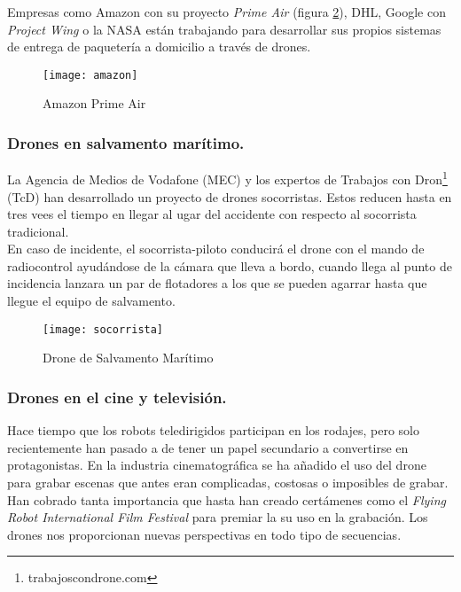 Empresas como Amazon con su proyecto \emph{Prime Air} (figura \ref{fig:amazon}), DHL, Google con \emph{Project Wing} o la NASA están trabajando para desarrollar sus propios sistemas de entrega de paquetería a domicilio a través de drones.\\

\begin{figure}[htb]
\centering
\texttt{[image: amazon]}
\caption{Amazon Prime Air}
\label{fig:amazon}
\end{figure}

\subsubsection{Drones en salvamento marítimo.}

La Agencia de Medios de Vodafone (MEC) y los expertos de Trabajos con Dron\footnote{trabajoscondrone.com} (TcD) han desarrollado un proyecto de drones socorristas. Estos reducen hasta en tres vees el tiempo en llegar al ugar del accidente con respecto al socorrista tradicional.\\

En caso de incidente, el socorrista-piloto conducirá el drone con el mando de radiocontrol ayudándose de la cámara que lleva a bordo, cuando llega al punto de incidencia lanzara un par de flotadores a los que se pueden agarrar hasta que llegue el equipo de salvamento.\\

 \begin{figure}[htb]
\centering
\texttt{[image: socorrista]}
\caption{Drone de Salvamento Marítimo}
\label{fig:amazon}
\end{figure}

\subsubsection{Drones en el cine y televisión.}

Hace tiempo que los robots teledirigidos participan en los rodajes, pero solo recientemente han pasado a de tener un papel secundario a convertirse en protagonistas. En la industria cinematográfica se ha añadido el uso del drone para grabar escenas que antes eran complicadas, costosas o imposibles de grabar. Han cobrado tanta importancia que hasta han creado certámenes como el \emph{Flying Robot International Film Festival} para premiar la su uso en la grabación. Los drones nos proporcionan nuevas perspectivas en todo tipo de secuencias.\\

